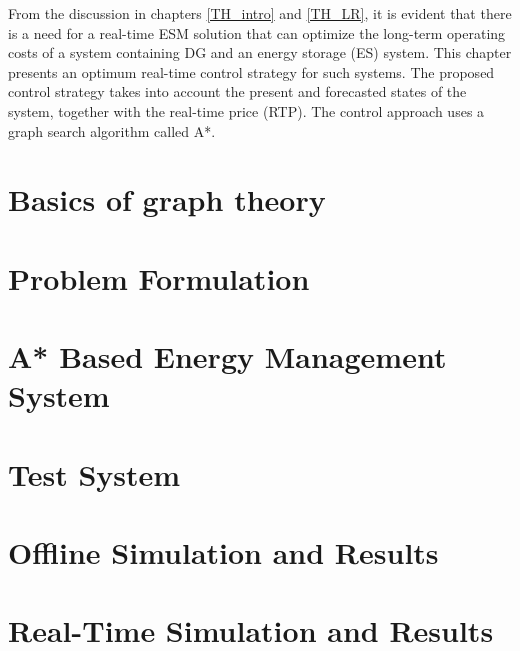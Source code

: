 From the discussion in chapters \ref{TH_intro} and \ref{TH_LR}, it is evident that there is a need for a real-time ESM solution that can optimize the long-term operating costs of a system containing DG and an energy storage (ES) system. This chapter presents an optimum real-time control strategy for such systems. The proposed control strategy takes into account the present and forecasted states of the system, together with the real-time price (RTP). The control approach uses a graph search algorithm called A*.  

\section{Basics of graph theory}



\section{Problem Formulation} \label{formulation}


\section{A* Based Energy Management System} \label{A*}


\section{Test System} \label{sys}


\section{Offline Simulation and Results} \label{OFF}


\section{Real-Time Simulation and Results} \label{RT}


